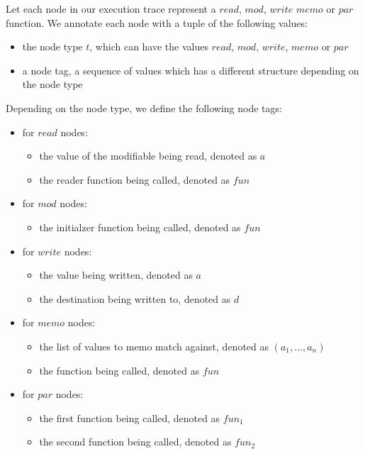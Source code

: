 \begin{definition}
Let each node in our execution trace represent a $read$, $mod$, $write$ $memo$ or $par$ function. We annotate each node with a tuple of the following values:
\begin{itemize}
\item the node type $t$, which can have the values $read$, $mod$, $write$, $memo$ or $par$
\item a node tag, a sequence of values which has a different structure depending on the node type 
\end{itemize}
Depending on the node type, we define the following node tags: 
\begin{itemize}
\item for $read$ nodes:
\begin{itemize}
\item the value of the modifiable being read, denoted as $a$
\item the reader function being called, denoted as $fun$
\end{itemize}
\item for $mod$ nodes:
\begin{itemize}
\item the initialzer function being called, denoted as $fun$
\end{itemize}
\item for $write$ nodes:
\begin{itemize}
\item the value being written, denoted as $a$
\item the destination being written to, denoted as $d$
\end{itemize}
\item for $memo$ nodes:
\begin{itemize}
\item the list of values to memo match against, denoted as $(a_1, ..., a_n)$
\item the function being called, denoted as $fun$
\end{itemize}
\item for $par$ nodes:
\begin{itemize}
\item the first function being called, denoted as $fun_1$
\item the second function being called, denoted as $fun_2$
\end{itemize}
\end{itemize}
\end{definition}

